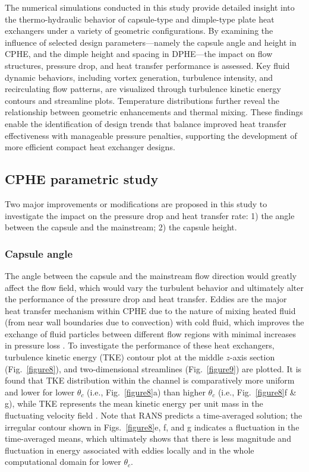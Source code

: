 \documentclass[review,12pt]{elsarticle}
\begin{document}
The numerical simulations conducted in this study provide detailed insight into the thermo-hydraulic behavior of capsule-type and dimple-type plate heat exchangers under a variety of geometric configurations. By examining the influence of selected design parameters---namely the capsule angle and height in CPHE, and the dimple height and spacing in DPHE---the impact on flow structures, pressure drop, and heat transfer performance is assessed. Key fluid dynamic behaviors, including vortex generation, turbulence intensity, and recirculating flow patterns, are visualized through turbulence kinetic energy contours and streamline plots. Temperature distributions further reveal the relationship between geometric enhancements and thermal mixing. These findings enable the identification of design trends that balance improved heat transfer effectiveness with manageable pressure penalties, supporting the development of more efficient compact heat exchanger designs.

\subsection{CPHE parametric study}
\label{sec:cphe_results}

Two major improvements or modifications are proposed in this study to investigate the impact on the pressure drop and heat transfer rate: 1) the angle between the capsule and the mainstream; 2) the capsule height.

\subsubsection{Capsule angle}
\label{sec:capsule_angle_results}

The angle between the capsule and the mainstream flow direction would greatly affect the flow field, which would vary the turbulent behavior and ultimately alter the performance of the pressure drop and heat transfer. Eddies are the major heat transfer mechanism within CPHE due to the nature of mixing heated fluid (from near wall boundaries due to convection) with cold fluid, which improves the exchange of fluid particles between different flow regions with minimal increases in pressure loss \citep{jacobi1995}. To investigate the performance of these heat exchangers, turbulence kinetic energy (TKE) contour plot at the middle $z$-axis section (Fig.~\ref{figure8}), and two-dimensional streamlines (Fig.~\ref{figure9}) are plotted. It is found that TKE distribution within the channel is comparatively more uniform and lower for lower $\theta_c$ (i.e., Fig.~\ref{figure8}a) than higher $\theta_c$ (i.e., Fig.~\ref{figure8}f \& g), while TKE represents the mean kinetic energy per unit mass in the fluctuating velocity field \citep{pope2000}. Note that RANS predicts a time-averaged solution; the irregular contour shown in Figs.~\ref{figure8}e, f, and g indicates a fluctuation in the time-averaged means, which ultimately shows that there is less magnitude and fluctuation in energy associated with eddies locally and in the whole computational domain for lower $\theta_c$.
\end{document}
